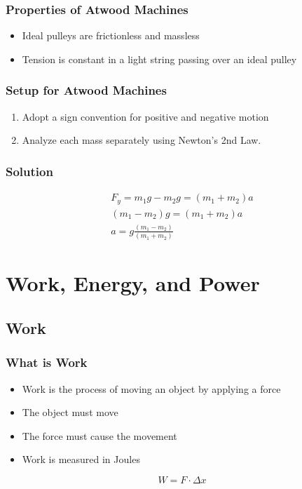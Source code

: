 \documentclass[12pt]{article}
\theoremstyle{break}
\numberwithin{theorem}{subsection}
\numberwithin{lemma}{subsection}
\numberwithin{corollary}{subsection}
\numberwithin{equation}{subsection}
\begin{document}
\subsubsection{Properties of Atwood Machines}
\begin{itemize}
	\item Ideal pulleys are frictionless and massless
	\item Tension is constant in a light string passing over an ideal pulley
\end{itemize}

\subsubsection{Setup for Atwood Machines}
\begin{enumerate}
	\item Adopt a sign convention for positive and negative motion
	\item Analyze each mass separately using Newton's 2nd Law.
\end{enumerate}

\subsubsection{Solution}
\begin{align*}
F_{y} = m_1 g - m_2 g = (m_1 + m_2)a \\
(m_1 - m_2)g = (m_1 + m_2)a \\
a = g \frac{(m_1 - m_2)}{(m_1 + m_2)}
\end{align*}

\section{Work, Energy, and Power}

\subsection{Work}

\subsubsection{What is Work}
\begin{itemize}
	\item Work is the process of moving an object by applying a force
	\item The object must move
	\item The force must cause the movement
	\item Work is measured in Joules
\end{itemize}
\begin{equation*}
W = F \cdot \Delta x
\end{equation*}
\end{document}
